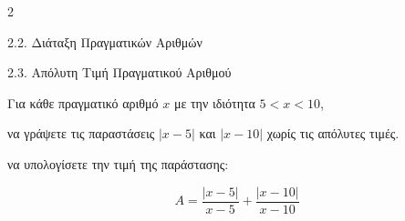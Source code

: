 \begin{ylh}{2}
    \item 2.2. Διάταξη Πραγματικών Αριθμών
    \item 2.3. Απόλυτη Τιμή Πραγματικού Αριθμού
\end{ylh}
Για κάθε πραγματικό αριθμό $x$ με την ιδιότητα $5 < x < 10$,

\begin{alist}
\item να γράψετε τις παραστάσεις $|x - 5|$ και $|x - 10|$ χωρίς τις απόλυτες τιμές.
\item να υπολογίσετε την τιμή της παράστασης:

\[ {A} = \dfrac{|x - 5|}{x - 5} + \dfrac{|x - 10|}{x - 10} \]
\end{alist}

